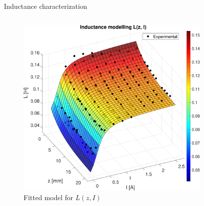 \begin{frame}{Inductance characterization}
{\begin{columns}[c, onlytextwidth]
            \begin{column}{0.60\textwidth}

                \begin{figure}
                    \centering
                    \includegraphics[width=0.85\textwidth]{img/MATLAB/identification/inductance.pdf}
                    \caption{Fitted model for $L(z, I)$}
                \end{figure}
            \end{column}

        \end{columns}

    }

\end{frame}



